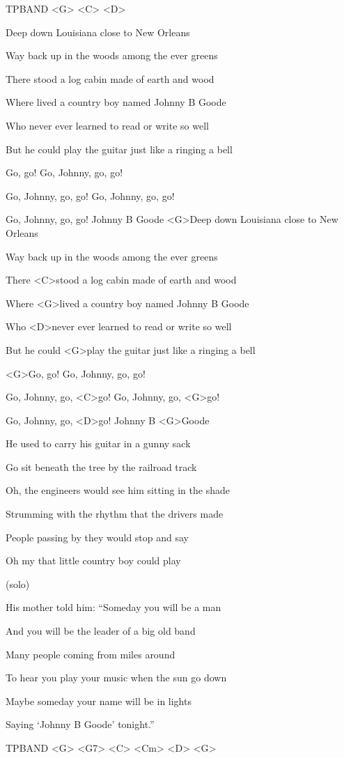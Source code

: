 
\ifdefined TPBAND
<G> <C> <D>

\zs
Deep down Louisiana close to New Orleans

Way back up in the woods among the ever greens

There stood a log cabin made of earth and wood

Where lived a country boy named Johnny B Goode

Who never ever learned to read or write so well

But he could play the guitar just like a ringing a bell
\ks

\zr
Go, go! Go, Johnny, go, go!

Go, Johnny, go, go! Go, Johnny, go, go!

Go, Johnny, go, go! Johnny B Goode
\kr
\else
\zs
<G>Deep down Louisiana close to New Orleans

Way back up in the woods among the ever greens

There <C>stood a log cabin made of earth and wood

Where <G>lived a country boy named Johnny B Goode

Who <D>never ever learned to read or write so well

But he could <G>play the guitar just like a ringing a bell
\ks

\zr
<G>Go, go! Go, Johnny, go, go!

Go, Johnny, go, <C>go! Go, Johnny, go, <G>go!

Go, Johnny, go, <D>go! Johnny B <G>Goode
\kr
\fi

\zs
He used to carry his guitar in a gunny sack

Go sit beneath the tree by the railroad track

Oh, the engineers would see him sitting in the shade

Strumming with the rhythm that the drivers made

People passing by they would stop and say

Oh my that little country boy could play
\ks

\zr\kr

\zs (solo) \ks 

\zs
His mother told him: ``Someday you will be a man

And you will be the leader of a big old band

Many people coming from miles around

To hear you play your music when the sun go down

Maybe someday your name will be in lights

Saying `Johnny B Goode' tonight.''
\ks

\zr\kr

\ifdefined TPBAND
<G> <G7> <C> <Cm> <D> <G>
\fi
\kp

